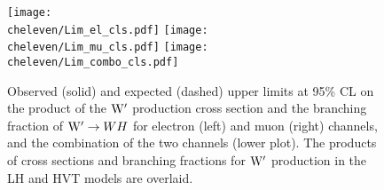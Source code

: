 \begin{figure}[htbp]
\centering
\texttt{[image: \\cheleven/Lim\_el\_cls.pdf]}
\texttt{[image: \\cheleven/Lim\_mu\_cls.pdf]}
\texttt{[image: \\cheleven/Lim\_combo\_cls.pdf]}
\caption{
  Observed (solid) and expected (dashed) upper limits at 95\% CL on the
  product of the $\mathrm{W}^\prime$ production cross section and the branching
  fraction of $\mathrm{W}^\prime\to WH$ for electron (left) and muon (right) channels,
  and the combination of the two channels (lower plot). The products of cross sections and branching fractions for $\mathrm{W}^\prime$ production in the LH and HVT models are overlaid.
}
\label{fig:seperateLimits_FullCLs}
\end{figure}